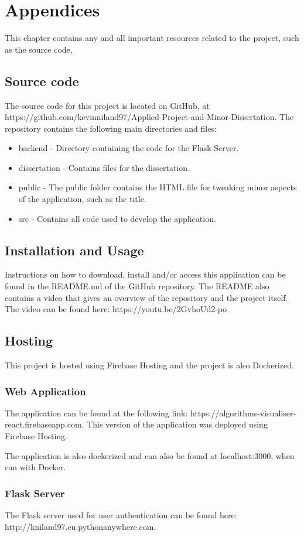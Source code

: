 \chapter{Appendices}
This chapter contains any and all important resources related to the project, such as the source code, 

\section{Source code}
The source code for this project is located on GitHub, at https://github.com/kevinniland97/Applied-Project-and-Minor-Dissertation. The repository contains the following main directories and files:

\begin{itemize}
    \item backend - Directory containing the code for the Flask Server.
    \item dissertation - Contains files for the dissertation.
    \item public - The public folder contains the HTML file for tweaking minor aspects of the application, such as the title.
    \item src - Contains all code used to develop the application.
\end{itemize}

\section{Installation and Usage}
Instructions on how to download, install and/or access this application can be found in the README.md of the GitHub repository. The README also contains a video that gives an overview of the repository and the project itself. The video can be found here: https://youtu.be/2GvhoUd2-po

\newpage
\section{Hosting}
This project is hosted using Firebase Hosting and the project is also Dockerized.

\subsection{Web Application}
The application can be found at the following link: https://algorithms-visualiser-react.firebaseapp.com. This version of the application was deployed using Firebase Hosting.

\medskip
The application is also dockerized and can also be found at localhost:3000, when run with Docker.

\subsection{Flask Server}
The Flask server used for user authentication can be found here: http://kniland97.eu.pythonanywhere.com.